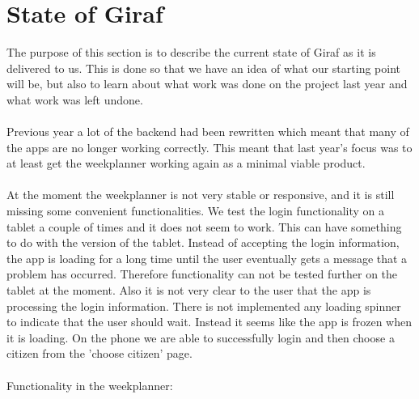 \section{State of Giraf}
The purpose of this section is to describe the current state of Giraf as it is delivered to us. 
This is done so that we have an idea of what our starting point will be,
but also to learn about what work was done on the project last year and what work was left undone. 
\\\\
Previous year a lot of the backend had been rewritten which meant that many of the apps are no longer working correctly. 
This meant that last year's focus was to at least get the weekplanner working again as a minimal viable product.
\\\\
At the moment the weekplanner is not very stable or responsive, and it is still missing some convenient functionalities. 
We test the login functionality on a tablet a couple of times and it does not seem to work. This can have something to do with the version of the tablet.
Instead of accepting the login information, the app is loading for a long time until the user eventually gets a message that a problem has occurred. 
Therefore functionality can not be tested further on the tablet at the moment. Also it is not very clear to the user that the app is processing the login information. 
There is not implemented any loading spinner to indicate that the user should wait. Instead it seems like the app is frozen when it is loading.
On the phone we are able to successfully login and then choose a citizen from the 'choose citizen' page.
\\\\
Functionality in the weekplanner:
